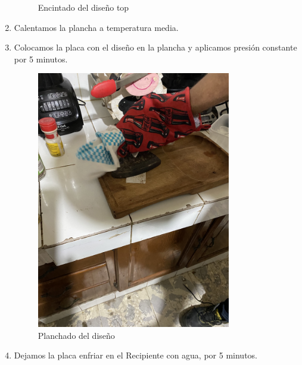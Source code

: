\documentclass[12pt]{report}
\begin{document}
\begin{enumerate}
\begin{figure}[H]
          \caption{Encintado del diseño top}
      \end{figure}
  \item Calentamos la plancha a temperatura media.
  \item Colocamos la placa con el diseño en la plancha y aplicamos presión constante por 5 minutos.
      \begin{figure}[H]
        \centering
        \includegraphics[width=0.8\textwidth]{screenshots/img6.jpg}
        \caption{Planchado del diseño}
      \end{figure}
  \item Dejamos la placa enfriar en el Recipiente con agua, por 5 minutos.
    \begin{figure}[H]
      \centering

\end{figure}
\end{enumerate}
\end{document}

